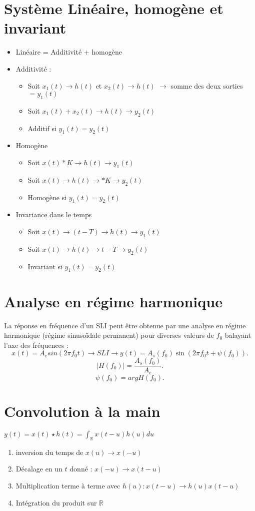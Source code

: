 \documentclass{article}
\theoremstyle{plain}%
\theoremstyle{definition}
\theoremstyle{remark}
\begin{document}
\section{Système Linéaire, homogène et invariant}
\begin{itemize}
    \item Linéaire = Additivité + homogène 
    \item Additivité : \begin{itemize}
        \item Soit $ x_1(t) \to h(t) $ et $ x_2(t) \to h(t) $ $\rightarrow$ somme des deux sorties $ = y_1(t) $
        \item Soit $ x_1(t)+x_2(t) \to h(t) \to y_2(t) $
        \item Additif si $ y_1(t) = y_2(t) $  
    \end{itemize} 
    \item Homogène \begin{itemize}
        \item Soit $ x(t)*K \to h(t) \to y_1(t)$ 
        \item Soit $ x(t) \to h(t) \to *K \to y_2(t)$
        \item Homogène si $ y_1(t) = y_2(t) $
    \end{itemize}
    \item Invariance dans le temps \begin{itemize}
        \item Soit $ x(t) \to (t-T) \to h(t) \to y_1(t) $ 
        \item Soit $ x(t) \to h(t) \to t-T \to y_2(t) $ 
        \item Invariant si $ y_1(t) = y_2(t) $
    \end{itemize}
\end{itemize}

\section{Analyse en régime harmonique}
La réponse en fréquence d'un SLI peut être obtenue par une analyse en régime harmonique (régime sinusoïdale permanent) pour diverses valeurs de $ f_0 $ balayant l'axe des fréquences :
\[
    x(t) = A_e sin(2 \pi f_0 t) \to SLI \to y(t) = A_s(f_0) \sin (2 \pi f_0 t + \psi (f_0))
.\]
\[
    \left| H(f_0) \right| = \frac{A_s (f_0)}{A_e}
.\]
\[
    \psi (f_0) = arg H(f_0)
.\]

\section{Convolution à la main}
$ y(t) = x(t) \star h(t) = \int_{\mathbb{R}}^{}x(t-u)h(u)du $ 
\begin{enumerate}
    \item inversion du temps de $ x(u) \to x(-u) $
    \item Décalage en un $ t $ donné : $ x(-u) \to x(t - u) $
    \item Multiplication terme à terme avec $ h(u) : x(t - u) \to h(u)x(t-u) $  
    \item Intégration du produit sur $ \mathbb{R} $ 
\end{enumerate}
\end{document}
